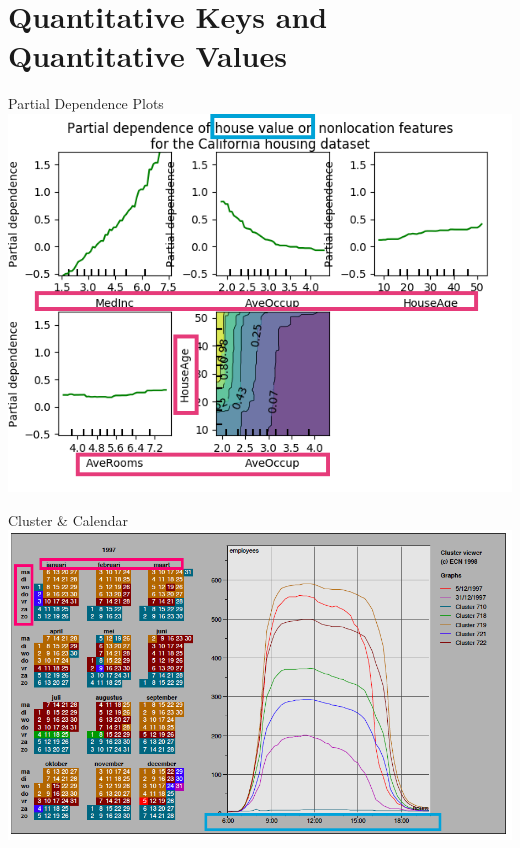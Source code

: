 \documentclass[xcolor={dvipsnames}]{beamer}
\begin{document}
\section{Quantitative Keys and Quantitative Values}
\frame{\sectionpage}

\begin{frame}{Partial Dependence Plots\cite{_elements_2009}}
\includegraphics[width=\textwidth]{figs/partial_dependence.png}

\end{frame}

\begin{frame}{Cluster \& Calendar\cite{van_wijk_cluster_1999}}
\includegraphics[width=\textwidth]{figs/calendar.png}
\end{frame}
\end{document}
